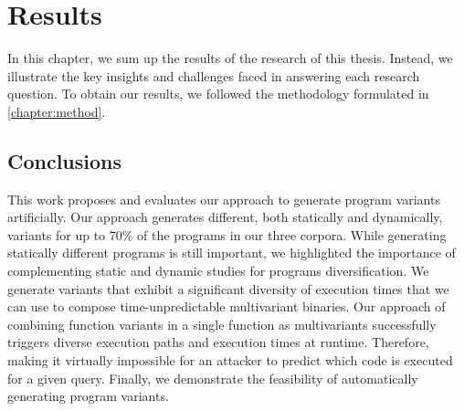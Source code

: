 \chapter{Results} 

In this chapter, we sum up the results of the research of this thesis.  Instead, we illustrate the key insights and challenges faced in answering each research question.  To obtain our results, we followed the methodology formulated in \autoref{chapter:method}.







\pagebreak
\section{Conclusions}

This work proposes and evaluates our approach to generate \wasm program variants artificially. Our approach generates different, both statically and dynamically, variants for up to 70\% of the programs in our three corpora. While generating statically different programs is still important, we highlighted the importance of complementing static and dynamic studies for programs diversification. We generate variants that exhibit a significant diversity of execution times that we can use to compose time-unpredictable multivariant binaries. Our approach of combining function variants in a single function as multivariants successfully triggers diverse execution paths and execution times at runtime. Therefore, making it virtually impossible for an attacker to predict which code is executed for a given query. Finally, we demonstrate the feasibility of automatically generating \wasm program variants.

